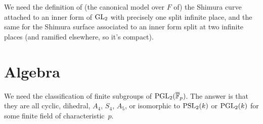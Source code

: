 \begin{definition} We need the definition of (the canonical model over $F$ of) the Shimura curve attached to an inner form of $\operatorname{GL}_2$ with precisely one split infinite place, and the same for the Shimura surface associated to an inner form split at two infinite places (and ramified elsewhere, so it's compact).
\end{definition}

\section{Algebra}

We need the classification of finite subgroups of $\operatorname{PGL}_2(\overline{\mathbb{F}}_p)$. The answer is that they are all cyclic, dihedral, $A_4$, $S_4$, $A_5$, or isomorphic to $\operatorname{PSL}_2(k)$ or $\operatorname{PGL}_2(k)$ for some finite field of characteristic~$p$.